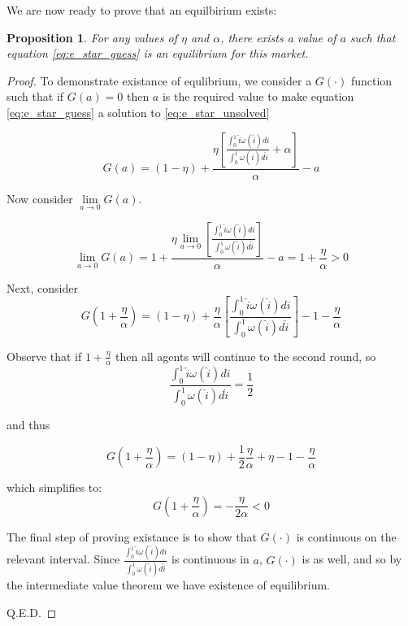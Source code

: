 \documentclass[WP]{AEA}
\newtheorem{prop}{Proposition}
\begin{document}
We are now ready to prove that an equilbirium exists:
\begin{prop} \label{prop:existence}  
	For any values of $\eta$ and $\alpha$, there exists a value of $a$ such that equation \ref{eq:e_star_guess} is an equilibrium for this market.
\end{prop}
\begin{proof}
To demonstrate existance of equlibrium, we consider a $G(\cdot)$ function such that if $G(a) = 0$ then $a$ is the required value to make equation \ref{eq:e_star_guess} a solution to \ref{eq:e_star_unsolved}

\begin{equation} \label{eq:G_fxn}
G(a) = (1-\eta) + \frac{   \eta\left[ \frac{\int_0^1 \hat{i} \omega(\hat{i}) di}{\int_0^1  \omega(\hat{i}) d\hat{i}} + \alpha  \right] }{\alpha} - a
\end{equation}

Now consider $\lim\limits_{a \to 0}G(a)$.

\begin{equation}
\lim\limits_{a \to 0}G(a) = 1+ \frac{   \eta \lim\limits_{a \to 0}\left[ \frac{\int_0^1 \hat{i} \omega(\hat{i}) di}{\int_0^1  \omega(\hat{i}) d\hat{i}}   \right] }{\alpha} - a = 1+ \frac{\eta}{\alpha} > 0
\end{equation} 




Next, consider 
\begin{equation*}
G(1+\frac{\eta }{\alpha}) = (1-\eta) + \frac{   \eta }{\alpha}\left[ \frac{\int_0^1 \hat{i} \omega(\hat{i}) di}{\int_0^1  \omega(\hat{i}) d\hat{i}}   \right] -1 -\frac{\eta }{\alpha}
\end{equation*}

Observe that if $1+\frac{\eta }{\alpha}$ then all agents will continue to the second round, so
$$\frac{\int_0^1 \hat{i} \omega(\hat{i}) di}{\int_0^1  \omega(\hat{i}) d\hat{i}}  = \frac{1}{2} $$

and thus 

\begin{equation*}
G(1+\frac{\eta }{\alpha}) = (1-\eta) + \frac{1}{2} \frac{   \eta }{\alpha } + \eta -1 -\frac{\eta }{\alpha} 
\end{equation*}

which simplifies to:
\begin{equation} \label{eq:G_g_0}
G(1+\frac{\eta }{\alpha}) =-\frac{\eta}{ 2 \alpha } < 0 
\end{equation}


The final step of proving existance is to show that $G(\cdot)$ is continuous on the relevant interval. Since  $ \frac{\int_0^1 \hat{i} \omega(\hat{i}) di}{\int_0^1  \omega(\hat{i}) d\hat{i}} $ is continuous in $a$, $G(\cdot)$ is as well, and so by the intermediate value theorem we have existence of equilibrium.

Q.E.D.
\end{proof}
\end{document}
